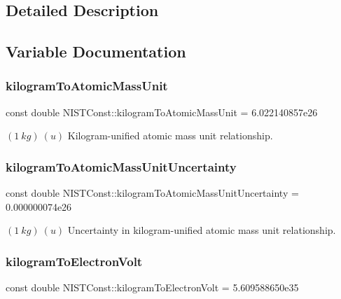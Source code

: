 \subsection{Detailed Description}


\subsection{Variable Documentation}
\mbox{\label{group___kilogram_gaa6a5187e436c3ce769319ad4968d53ff}} 
\subsubsection{\texorpdfstring{kilogram\+To\+Atomic\+Mass\+Unit}{kilogramToAtomicMassUnit}}
{\footnotesize\ttfamily const double N\+I\+S\+T\+Const\+::kilogram\+To\+Atomic\+Mass\+Unit = 6.\+022140857e26}

$(1\ kg)\ (u)$ Kilogram-\/unified atomic mass unit relationship. \mbox{\label{group___kilogram_ga0a840aeb3ea862ed078ead0caf886dfb}} 
\subsubsection{\texorpdfstring{kilogram\+To\+Atomic\+Mass\+Unit\+Uncertainty}{kilogramToAtomicMassUnitUncertainty}}
{\footnotesize\ttfamily const double N\+I\+S\+T\+Const\+::kilogram\+To\+Atomic\+Mass\+Unit\+Uncertainty = 0.\+000000074e26}

$(1\ kg)\ (u)$ Uncertainty in kilogram-\/unified atomic mass unit relationship. \mbox{\label{group___kilogram_gae0d25d28f6a0596f2dd5f8b3dc5ebb38}} 
\subsubsection{\texorpdfstring{kilogram\+To\+Electron\+Volt}{kilogramToElectronVolt}}
{\footnotesize\ttfamily const double N\+I\+S\+T\+Const\+::kilogram\+To\+Electron\+Volt = 5.\+609588650e35}

